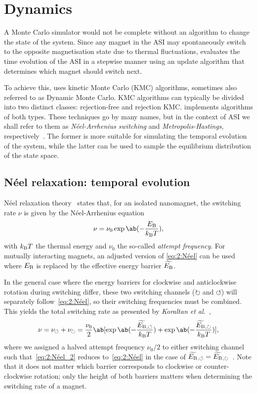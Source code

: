 \section{Dynamics}\label{sec:2:Dynamics}
A Monte Carlo simulator would not be complete without an algorithm to change the state of the system.
Since any magnet in the ASI may spontaneously switch to the opposite magnetisation state due to thermal fluctuations, \hotspice evaluates the time evolution of the ASI in a stepwise manner using an update algorithm that determines which magnet should switch next. \par
To achieve this, \hotspice uses kinetic Monte Carlo (KMC) algorithms, sometimes also referred to as Dynamic Monte Carlo.
KMC algorithms can typically be divided into two distinct classes: rejection-free and rejection KMC.
\hotspice implements algorithms of both types.
These techniques go by many names, but in the context of ASI we shall refer to them as \textit{N\'eel-Arrhenius switching} and \textit{Metropolis-Hastings}, respectively~\cite{PhysicalTimeKMC}.
The former is more suitable for simulating the temporal evolution of the system, while the latter can be used to sample the equilibrium distribution of the state space.

\subsection{N\'eel relaxation: temporal evolution}
N\'eel relaxation theory~\cite{neel1949theorie} states that, for an isolated nanomagnet, the switching rate $\nu$ is given by the N\'eel-Arrhenius equation
\begin{equation}
	\nu = \nu_0 \exp\ab(-\frac{\EB}{\kBT}) \mathrm{,}
	\label{eq:2:Néel}
\end{equation}
with $\kBT$ the thermal energy and $\nu_0$ the so-called \textit{attempt frequency}.
For mutually interacting magnets, an adjusted version of \cref{eq:2:Néel} can be used where $E_\mathrm{B}$ is replaced by the effective energy barrier $\widetilde{E_\mathrm{B}}$. \par
In the general case where the energy barriers for clockwise and anticlockwise rotation during switching differ, these two switching channels ($\circlearrowright$ and $\circlearrowleft$) will separately follow~\cref{eq:2:Néel}, so their switching frequencies must be combined.
This yields the total switching rate as presented by \textit{Koraltan et al.}~\cite{DirectionalEnergyBarrier},
\begin{equation}
	\nu = \nu_\circlearrowleft + \nu_\circlearrowright = \frac{\nu_0}{2} \ab[\exp\ab(-\frac{\EBeffLeft}{\kBT}) + \exp\ab(-\frac{\EBeffRight}{\kBT})] \mathrm{,}
	\label{eq:2:Néel_2}
\end{equation}
where we assigned a halved attempt frequency $\nu_0/2$ to either switching channel such that~\cref{eq:2:Néel_2} reduces to~\cref{eq:2:Néel} in the case of $\widetilde{E_\mathrm{B}}{}_{,\circlearrowleft}=\widetilde{E_\mathrm{B}}{}_{,\circlearrowright}$~\cite{leo2021chiral}.
Note that it does not matter which barrier corresponds to clockwise or counter-clockwise rotation; only the height of both barriers matters when determining the switching rate of a magnet. \par


